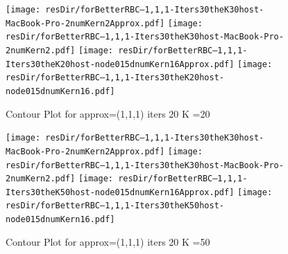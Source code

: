 \documentclass[12pt]{article}
\begin{document}
\begin{figure}
  \centering
\ifmacosx
  \texttt{[image: resDir/forBetterRBC--1,1,1-Iters30theK30host-MacBook-Pro-2numKern2Approx.pdf]}
  \texttt{[image: resDir/forBetterRBC--1,1,1-Iters30theK30host-MacBook-Pro-2numKern2.pdf]}
\fi
\iflinux
  \texttt{[image: resDir/forBetterRBC--1,1,1-Iters30theK20host-node015dnumKern16Approx.pdf]}
  \texttt{[image: resDir/forBetterRBC--1,1,1-Iters30theK20host-node015dnumKern16.pdf]}
\fi
  \caption{Contour Plot for approx=(1,1,1) iters 20 K =20}
  \label{fig:cntpltC}
\end{figure}


\begin{figure}
  \centering
\ifmacosx
  \texttt{[image: resDir/forBetterRBC--1,1,1-Iters30theK30host-MacBook-Pro-2numKern2Approx.pdf]}
  \texttt{[image: resDir/forBetterRBC--1,1,1-Iters30theK30host-MacBook-Pro-2numKern2.pdf]}
\fi
\iflinux
  \texttt{[image: resDir/forBetterRBC--1,1,1-Iters30theK50host-node015dnumKern16Approx.pdf]}
  \texttt{[image: resDir/forBetterRBC--1,1,1-Iters30theK50host-node015dnumKern16.pdf]}
\fi
  \caption{Contour Plot for approx=(1,1,1) iters 20 K =50}
  \label{fig:cntpltC}
\end{figure}




\end{document}
